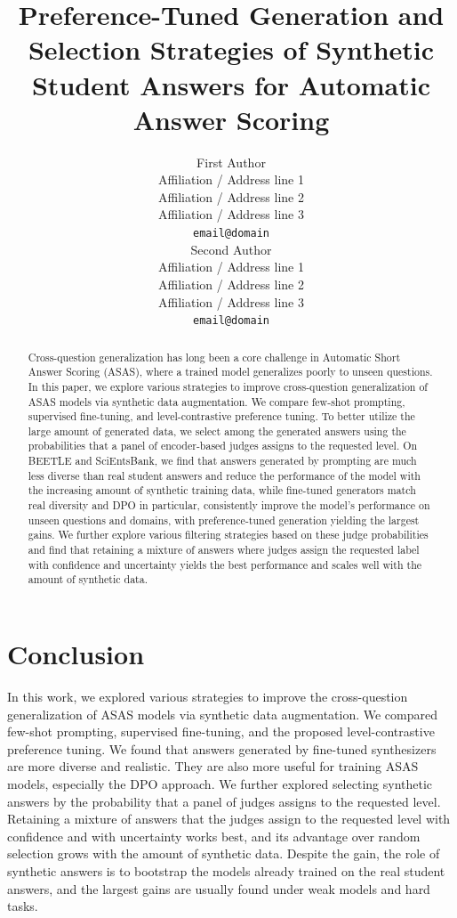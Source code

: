 \documentclass[11pt]{article}
\title{Preference-Tuned Generation and Selection Strategies of Synthetic Student Answers for Automatic Answer Scoring}
\author{First Author \\
  Affiliation / Address line 1 \\
  Affiliation / Address line 2 \\
  Affiliation / Address line 3 \\
  \texttt{email@domain} \\\And
  Second Author \\
  Affiliation / Address line 1 \\
  Affiliation / Address line 2 \\
  Affiliation / Address line 3 \\
  \texttt{email@domain} \\}
\begin{document}
\maketitle
\begin{abstract}
Cross-question generalization has long been a core challenge in Automatic Short Answer Scoring (ASAS), where a trained model generalizes poorly to unseen questions. 
In this paper, we explore various strategies to improve cross-question generalization of ASAS models via synthetic data augmentation.
We compare few-shot prompting, supervised fine-tuning, and level-contrastive preference tuning. To better utilize the large amount of generated data, we select among the generated answers using the probabilities that a panel of encoder-based judges assigns to the requested level.
On BEETLE and SciEntsBank, we find that answers generated by prompting are much less diverse than real student answers and reduce the performance of the model with the increasing amount of synthetic training data, while fine-tuned generators match real diversity and DPO in particular, consistently improve the model's performance on unseen questions and domains, with preference-tuned generation yielding the largest gains.
We further explore various filtering strategies based on these judge probabilities and find that retaining a mixture of answers where judges assign the requested label with confidence and uncertainty yields the best performance and scales well with the amount of synthetic data.
\end{abstract}







\section{Conclusion}
In this work, we explored various strategies to improve the cross-question generalization of ASAS models via synthetic data augmentation. We compared few-shot prompting, supervised fine-tuning, and the proposed level-contrastive preference tuning. We found that answers generated by fine-tuned synthesizers are more diverse and realistic. They are also more useful for training ASAS models, especially the DPO approach. We further explored selecting synthetic answers by the probability that a panel of judges assigns to the requested level. Retaining a mixture of answers that the judges assign to the requested level with confidence and with uncertainty works best, and its advantage over random selection grows with the amount of synthetic data. Despite the gain, the role of synthetic answers is to bootstrap the models already trained on the real student answers, and the largest gains are usually found under weak models and hard tasks. 
\end{document}
